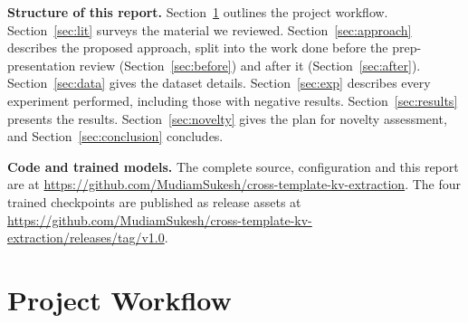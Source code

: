 \documentclass[11pt,a4paper]{article}
\begin{document}
\textbf{Structure of this report.} Section~\ref{sec:workflow} outlines the project workflow.
Section~\ref{sec:lit} surveys the material we reviewed. Section~\ref{sec:approach} describes the
proposed approach, split into the work done before the prep-presentation review
(Section~\ref{sec:before}) and after it (Section~\ref{sec:after}). Section~\ref{sec:data} gives
the dataset details. Section~\ref{sec:exp} describes every experiment performed, including those
with negative results. Section~\ref{sec:results} presents the results.
Section~\ref{sec:novelty} gives the plan for novelty assessment, and
Section~\ref{sec:conclusion} concludes.

\begin{sloppypar}
\textbf{Code and trained models.} The complete source, configuration and this report are at
\url{https://github.com/MudiamSukesh/cross-template-kv-extraction}. The four trained
checkpoints are published as release assets at
\url{https://github.com/MudiamSukesh/cross-template-kv-extraction/releases/tag/v1.0}.
\end{sloppypar}

\section{Project Workflow}
\label{sec:workflow}
\end{document}
